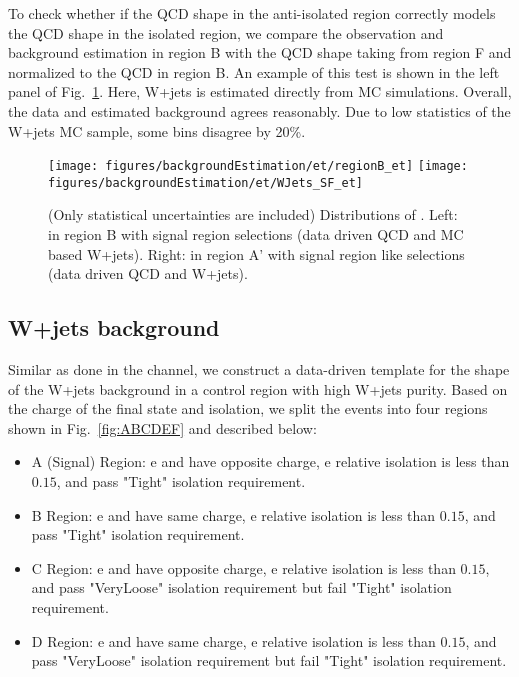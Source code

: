 To check whether if the QCD shape  in the anti-isolated region correctly 
models the QCD shape in the isolated region, we compare the 
observation and background estimation in region B with the QCD shape 
taking from region F and normalized to the QCD in region B.  
An example of this test is shown in the left panel of 
Fig.~\ref{fig:et_dataDrivenChecks}. Here, W+jets 
is estimated directly from MC simulations. Overall, the data and 
estimated background agrees reasonably. Due to low statistics of 
the W+jets MC sample, some bins disagree by 20\%.

\begin{figure}\centering
  \texttt{[image: figures/backgroundEstimation/et/regionB\_et]}
  \texttt{[image: figures/backgroundEstimation/et/WJets\_SF\_et]}
  \caption{\label{fig:et_dataDrivenChecks}(Only statistical uncertainties are included) Distributions of \meffetau. Left:
    in region B with signal region selections (data driven QCD and MC based W+jets).  Right:
    in region A' with signal region like selections (data driven QCD and W+jets).}
\end{figure}

\subsection{W+jets background}
\label{sec:et_w_bkg_validation}

Similar as done in the \tmth channel,  we construct 
a data-driven template for the shape of the W+jets background in a control 
region with high W+jets purity. Based on the charge of the final state and 
\tauh isolation, we split the events into four regions shown in 
Fig.~\ref{fig:ABCDEF} and described below:
\begin{itemize}
  \item A (Signal) Region: e and \tauh have opposite charge, e relative isolation is less than $0.15$, and \tauh pass "Tight" isolation requirement.
  \item B Region: e and \tauh have same charge, e relative isolation is less than $0.15$, and \tauh pass "Tight" isolation requirement.
  \item C Region: e and \tauh have opposite charge, e relative isolation is less than $0.15$, and \tauh pass "VeryLoose" isolation requirement but fail "Tight" isolation requirement.
  \item D Region: e and \tauh have same charge, e relative isolation is less than $0.15$, and \tauh pass "VeryLoose" isolation requirement but fail "Tight" isolation requirement.
\end{itemize}

